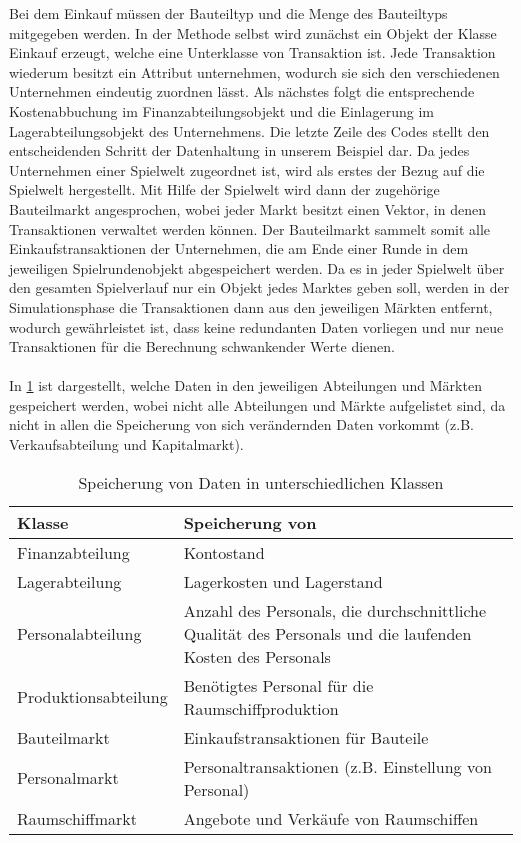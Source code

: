 Bei dem Einkauf müssen der Bauteiltyp und die Menge des Bauteiltyps mitgegeben werden. In der Methode selbst wird zunächst ein Objekt der Klasse Einkauf erzeugt, welche eine Unterklasse von Transaktion ist. Jede Transaktion wiederum besitzt ein Attribut unternehmen, wodurch sie sich den verschiedenen Unternehmen eindeutig zuordnen lässt. Als nächstes folgt die entsprechende Kostenabbuchung im Finanzabteilungsobjekt und die Einlagerung im Lagerabteilungsobjekt des Unternehmens. Die letzte Zeile des Codes stellt den entscheidenden Schritt der Datenhaltung in unserem Beispiel dar. Da jedes Unternehmen einer Spielwelt zugeordnet ist, wird als erstes der Bezug auf die Spielwelt hergestellt. Mit Hilfe der Spielwelt wird dann der zugehörige Bauteilmarkt angesprochen, wobei jeder Markt besitzt einen Vektor, in denen Transaktionen verwaltet werden können. Der Bauteilmarkt sammelt somit alle Einkaufstransaktionen der Unternehmen, die am Ende einer Runde in dem jeweiligen Spielrundenobjekt abgespeichert werden. Da es in jeder Spielwelt über den gesamten Spielverlauf nur ein Objekt jedes Marktes geben soll, werden in der Simulationsphase die Transaktionen dann aus den jeweiligen Märkten entfernt, wodurch gewährleistet ist, dass keine redundanten Daten vorliegen und nur neue Transaktionen für die Berechnung schwankender Werte dienen.
\\
\\
In \ref{tab:fachkonzept-implementierung-erläuterung-datenhaltung} ist dargestellt, welche Daten in den jeweiligen Abteilungen und Märkten gespeichert werden, wobei nicht alle Abteilungen und Märkte aufgelistet sind, da nicht in allen die Speicherung von sich verändernden Daten vorkommt (z.B. Verkaufsabteilung und Kapitalmarkt).

\begin{table}[ht]\small
     \centering
     \begin{tabular}{| p{4cm} |p{\textwidth -5cm} |}
          \hline
          Klasse & Speicherung von \\
          \hline \hline
          Finanzabteilung & Kontostand \\ \hline
          Lagerabteilung & Lagerkosten und Lagerstand  \\ \hline
          Personalabteilung & Anzahl des Personals, die durchschnittliche Qualität des Personals und die 			  laufenden Kosten des Personals \\ \hline
          Produktionsabteilung & Benötigtes Personal für die Raumschiffproduktion \\ \hline
          Bauteilmarkt & Einkaufstransaktionen für Bauteile \\ \hline
          Personalmarkt & Personaltransaktionen (z.B. Einstellung von Personal) \\ \hline
          Raumschiffmarkt & Angebote und Verkäufe von Raumschiffen \\ 
          \hline    
     \end{tabular}
     \caption{Speicherung von Daten in unterschiedlichen Klassen}
     \label{tab:fachkonzept-implementierung-erläuterung-datenhaltung}
\end{table}

